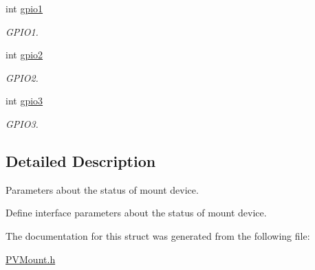 \begin{DoxyCompactItemize}
\mbox{\label{struct_p_v_s_d_k___m_o_u_n_t_a_p_i___m_o_u_n_t_s_t_a_t_e___d_e_v_i_c_e_ae2400e468be908140253f0a8c8bdae50}} 
int \hyperlink{struct_p_v_s_d_k___m_o_u_n_t_a_p_i___m_o_u_n_t_s_t_a_t_e___d_e_v_i_c_e_ae2400e468be908140253f0a8c8bdae50}{gpio1}
\begin{DoxyCompactList}\small\item\em G\+P\+I\+O1. \end{DoxyCompactList}\item 
\mbox{\label{struct_p_v_s_d_k___m_o_u_n_t_a_p_i___m_o_u_n_t_s_t_a_t_e___d_e_v_i_c_e_ad9d22f9df7ee03fb337db01f49e2a293}} 
int \hyperlink{struct_p_v_s_d_k___m_o_u_n_t_a_p_i___m_o_u_n_t_s_t_a_t_e___d_e_v_i_c_e_ad9d22f9df7ee03fb337db01f49e2a293}{gpio2}
\begin{DoxyCompactList}\small\item\em G\+P\+I\+O2. \end{DoxyCompactList}\item 
\mbox{\label{struct_p_v_s_d_k___m_o_u_n_t_a_p_i___m_o_u_n_t_s_t_a_t_e___d_e_v_i_c_e_a3a80d2ed0955e4f8d6fa5f57f10f40d4}} 
int \hyperlink{struct_p_v_s_d_k___m_o_u_n_t_a_p_i___m_o_u_n_t_s_t_a_t_e___d_e_v_i_c_e_a3a80d2ed0955e4f8d6fa5f57f10f40d4}{gpio3}
\begin{DoxyCompactList}\small\item\em G\+P\+I\+O3. \end{DoxyCompactList}\end{DoxyCompactItemize}


\subsection{Detailed Description}
Parameters about the status of mount device. 

Define interface parameters about the status of mount device. 

The documentation for this struct was generated from the following file\+:\begin{DoxyCompactItemize}
\item 
\hyperlink{_p_v_mount_8h}{P\+V\+Mount.\+h}\end{DoxyCompactItemize}
